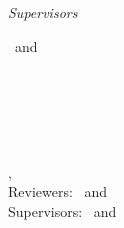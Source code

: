 \begin{titlepage}
	\vfill
	\begin{minipage}[t]{.27\textwidth}
		\raggedleft
	\end{minipage}
	\hspace*{15pt}
	\begin{minipage}[t]{.65\textwidth}
	\end{minipage} \\[5mm]
	\begin{minipage}[t]{.27\textwidth}
		\raggedleft
	\end{minipage}
	\hspace*{15pt}
	\begin{minipage}[t]{.65\textwidth}
	\end{minipage} \\[10mm]
	\begin{minipage}[t]{.27\textwidth}
		\raggedleft
		\textit{Supervisors}
	\end{minipage}
	\hspace*{15pt}
	\begin{minipage}[t]{.65\textwidth}
		\thesisFirstSupervisor\ and \thesisSecondSupervisor
	\end{minipage} \\[10mm]

	\thesisDate \\

\end{titlepage}


\hfill
\vfill
{
	\small
	\textbf{\thesisName} \\
	\textit{\thesisTitle} \\
	\thesisSubject, \thesisDate \\
	Reviewers: \thesisFirstReviewer\ and \thesisSecondReviewer \\
	Supervisors: \thesisFirstSupervisor\ and \thesisSecondSupervisor \\[1.5em]
	\textbf{\thesisUniversity} \\
	\textit{\thesisUniversityGroup} \\
	\thesisUniversityDepartment \\
	\thesisUniversityStreetAddress \\
	\thesisUniversityPostalCode\ \thesisUniversityCity
}
